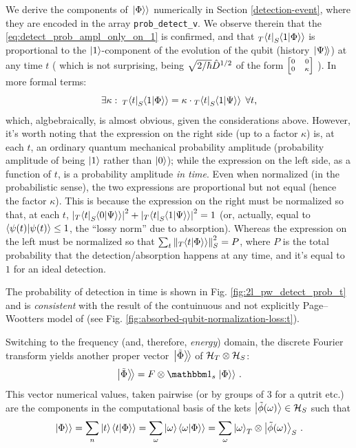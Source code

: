 We derive the components of $\left.\left| \Phi \right\rangle\right\rangle$ numerically in Section \ref{detection-event},
where they are encoded in the array \texttt{prob_detect_v}.
We observe therein that the \eqref{eq:detect_prob_ampl_only_on_1} is confirmed,
and that ${}_T\!\bra{t} {}_S\!\!\left.\left\langle 1 \middle| \Phi \right\rangle\right\rangle$ is proportional
to the $\ket{1}$-component of the evolution of the qubit (history $\left.\left| \Psi \right\rangle\!\right\rangle$)
at any time $t$
(%
  which is not surprising, being $\sqrt{2/\hbar}\hat{D}^{1/2}$ of the form
  $\scriptsize \left[\begin{matrix}0 & 0\\0 & \kappa \end{matrix}\right]$%
).
In more formal terms:
\begin{equation}\label{eq:detect_prob_amplitude_proportional}
  \exists \kappa: \: {}_T\!\bra{t} {}_S\!\!\left.\left\langle 1 \middle| \Phi \right\rangle\right\rangle = \kappa \cdot {}_T\!\bra{t} {}_S\!\!\left.\left\langle 1 \middle| \Psi \right\rangle\right\rangle \; \forall t \text{,}
\end{equation}
which, algbebraically, is almost obvious, given the considerations above.
However, it's worth noting that the expression on the right side
(up to a factor $\kappa$) is, at each $t$,
an ordinary quantum mechanical probability amplitude
(probability amplitude of being $\ket{1}$ rather than $\ket{0}$);
while the expression on the left side, as a function of $t$,
is a probability amplitude \emph{in time}.
Even when normalized (in the probabilistic sense), the two expressions
are proportional but not equal (hence the factor $\kappa$).
This is because the expression on the right must be normalized
so that, at each $t$,
${ \abs{ {}_T\!\bra{t} {}_S\!\!\left.\left\langle 0 \middle| \Psi \right\rangle\right\rangle }^2 + \abs{ {}_T\!\bra{t} {}_S\!\!\left.\left\langle 1 \middle| \Psi \right\rangle\right\rangle }^2 = 1 }$
(or, actually, equal to $ \braket{\psi(t)} \leq 1$, the ``lossy norm'' due to absorption).
Whereas the expression on the left must be normalized so that
$\sum_t \norm{ {}_T\!\!\left.\left\langle t \middle| \Phi \right\rangle\right\rangle }_S^2 = P$,
where $P$ is the total probability that the detection/absorption happens at any time,
and it's equal to $1$ for an ideal detection.

\citereset
The probability of detection in time is shown in Fig. \ref{fig:2l_pw_detect_prob_t}
and is \emph{consistent} with the result of
the contuinuous and not explicitly Page--Wootters model of
\cite{RuschhauptAbsorption} (see Fig. \ref{fig:absorbed-qubit-normalization-loss:t}).

Switching to the frequency (and, therefore, \emph{energy}) domain,
the discrete Fourier transform yields another proper vector
$\left.\left| \tilde{\Phi} \right\rangle\!\right\rangle$ of $\mathcal{H}_T \otimes \mathcal{H}_S$:
\begin{equation}
  \Dket{\tilde{\Phi}} = F \ox \idop_s \dket{\Phi} \, \text{.}
\end{equation}
This vector numerical values, taken pairwise
(or by groups of 3 for a qutrit etc.)
are the components in the computational basis
of the kets $\ket{\tilde{\phi}(\omega)} \in \mathcal{H}_S$
such that
\begin{equation}
  \left.\left| \Phi \right\rangle\right\rangle = \sum_n \ket{t}\!\left.\left\langle t \middle| \Phi \right\rangle\right\rangle = \sum_{\omega} \ket{\omega}\!\left.\left\langle \omega \middle| \Phi \right\rangle\right\rangle
    = \sum_{\omega} \ket{\omega}_T \otimes \ket{\tilde{\phi}(\omega)}_S \, \text{.}
\end{equation}

